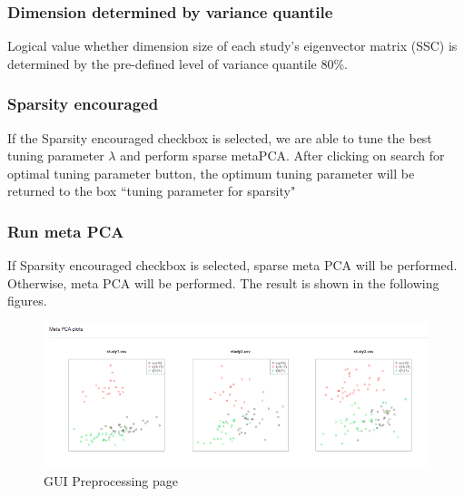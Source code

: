 \subsubsection{Dimension determined by variance quantile}
Logical value whether dimension size of each study's eigenvector matrix (SSC) is determined  by the pre-defined level of variance quantile 80\%.

\subsubsection{Sparsity encouraged}
If the Sparsity encouraged checkbox is selected, 
we are able to tune the best tuning parameter $\lambda$ and perform sparse metaPCA.
After clicking on search for optimal tuning parameter button, the optimum tuning parameter will be returned to the box ``tuning parameter for sparsity"

\subsubsection{Run meta PCA}
If Sparsity encouraged checkbox is selected, sparse meta PCA will be performed. 
Otherwise, meta PCA will be performed.
The result is shown in the following figures.

\begin{figure}[H]
\begin{center}
\includegraphics[scale=0.4]{./figure/metaPCA/metaPCA}
\caption{GUI Preprocessing page}
\label{fig:metaPCAresult}
\end{center}
\end{figure}

